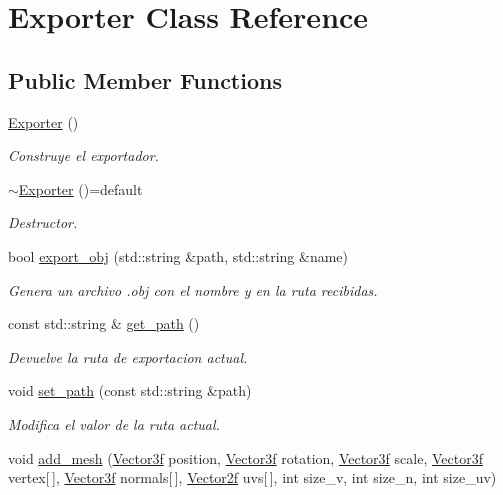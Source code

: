 \hypertarget{class_exporter}{}\section{Exporter Class Reference}
\label{class_exporter}
\subsection*{Public Member Functions}
\begin{DoxyCompactItemize}
\item 
\mbox{\hyperlink{class_exporter_a2a977cb5ac8f637fcb570e73f650eca0}{Exporter}} ()
\begin{DoxyCompactList}\small\item\em Construye el exportador. \end{DoxyCompactList}\item 
\mbox{\hyperlink{class_exporter_a0d1b2893c5cef1e4d4d52fcb1e0759ea}{$\sim$\+Exporter}} ()=default
\begin{DoxyCompactList}\small\item\em Destructor. \end{DoxyCompactList}\item 
bool \mbox{\hyperlink{class_exporter_af0025a505a4a0889a210467138c32b62}{export\+\_\+obj}} (std\+::string \&path, std\+::string \&name)
\begin{DoxyCompactList}\small\item\em Genera un archivo .obj con el nombre y en la ruta recibidas. \end{DoxyCompactList}\item 
const std\+::string \& \mbox{\hyperlink{class_exporter_a2e2191962453067d9b6befbc4b6842d1}{get\+\_\+path}} ()
\begin{DoxyCompactList}\small\item\em Devuelve la ruta de exportacion actual. \end{DoxyCompactList}\item 
void \mbox{\hyperlink{class_exporter_a5230d994d0bf785b380b9fd714f63779}{set\+\_\+path}} (const std\+::string \&path)
\begin{DoxyCompactList}\small\item\em Modifica el valor de la ruta actual. \end{DoxyCompactList}\item 
void \mbox{\hyperlink{class_exporter_a1435d0243f166ca6cd9a8e0c536ff0a5}{add\+\_\+mesh}} (\mbox{\hyperlink{structmathexp_1_1_vector3f}{Vector3f}} position, \mbox{\hyperlink{structmathexp_1_1_vector3f}{Vector3f}} rotation, \mbox{\hyperlink{structmathexp_1_1_vector3f}{Vector3f}} scale, \mbox{\hyperlink{structmathexp_1_1_vector3f}{Vector3f}} vertex\mbox{[}$\,$\mbox{]}, \mbox{\hyperlink{structmathexp_1_1_vector3f}{Vector3f}} normals\mbox{[}$\,$\mbox{]}, \mbox{\hyperlink{structmathexp_1_1_vector2f}{Vector2f}} uvs\mbox{[}$\,$\mbox{]}, int size\+\_\+v, int size\+\_\+n, int size\+\_\+uv)

\end{DoxyCompactItemize}

